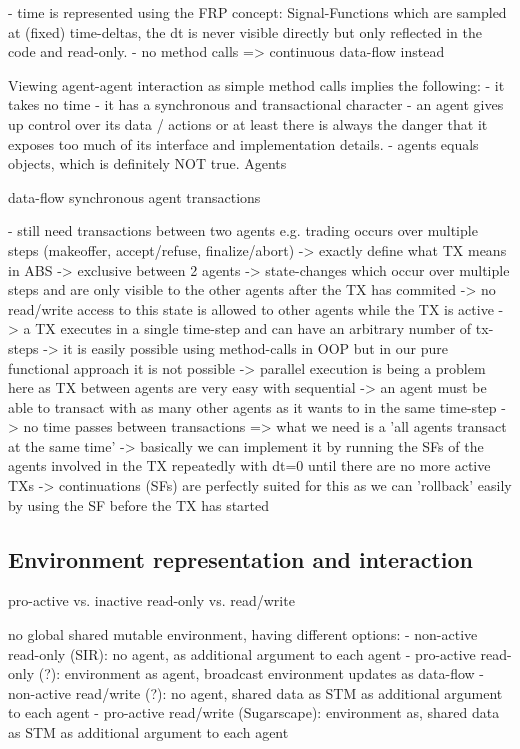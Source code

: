 - time is represented using the FRP concept: Signal-Functions which are sampled at (fixed) time-deltas, the dt is never visible directly but only reflected in the code and read-only.
- no method calls => continuous data-flow instead
	
Viewing agent-agent interaction as simple method calls implies the following:
- it takes no time
- it has a synchronous and transactional character
- an agent gives up control over its data / actions or at least there is always the danger that it exposes too much of its interface and implementation details. 
- agents equals objects, which is definitely NOT true. Agents 

data-flow
synchronous agent transactions

- still need transactions between two agents e.g. trading occurs over multiple steps (makeoffer, accept/refuse, finalize/abort) 
		-> exactly define what TX means in ABS
			-> exclusive between 2 agents
			-> state-changes which occur over multiple steps and are only visible to the other agents after the TX has commited
			-> no read/write access to this state is allowed to other agents while the TX is active
			-> a TX executes in a single time-step and can have an arbitrary number of tx-steps
		-> it is easily possible using method-calls in OOP but in our pure functional approach it is not possible
		-> parallel execution is being a problem here as TX between agents are very easy with sequential
		-> an agent must be able to transact with as many other agents as it wants to in the same time-step
		-> no time passes between transactions
		=> what we need is a 'all agents transact at the same time'
			-> basically we can implement it by running the SFs of the agents involved in the TX repeatedly with dt=0 until there are no more active TXs
			-> continuations (SFs) are perfectly suited for this as we can 'rollback' easily by using the SF before the TX has started
			
\subsection{Environment representation and interaction}
pro-active vs. inactive
read-only vs. read/write

no global shared mutable environment, having different options:
- non-active read-only (SIR): no agent, as additional argument to each agent
- pro-active read-only (?): environment as agent, broadcast environment updates as data-flow
- non-active read/write (?): no agent, shared data as STM as additional argument to each agent
- pro-active read/write (Sugarscape): environment as, shared data as STM as additional argument to each agent

